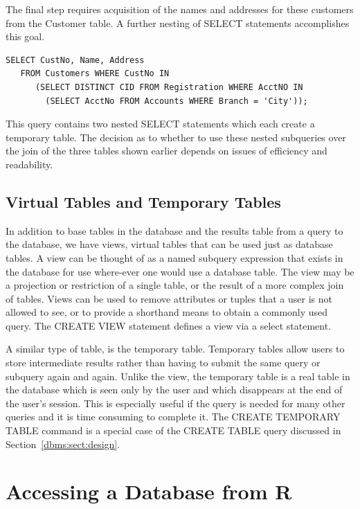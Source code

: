 The final step requires acquisition of the names and addresses 
for these customers from the Customer table.
A further nesting of SELECT statements accomplishes this goal.

\begin{verbatim}
SELECT CustNo, Name, Address
   FROM Customers WHERE CustNo IN 
      (SELECT DISTINCT CID FROM Registration WHERE AcctNO IN 
        (SELECT AcctNo FROM Accounts WHERE Branch = 'City'));
\end{verbatim}

This query contains two nested SELECT statements which each create a 
temporary table.  The decision as to whether to use these nested
subqueries over the join of the three tables shown earlier
depends on issues of efficiency and readability.


\subsection{Virtual Tables and Temporary Tables}
In addition to base tables in the database and 
the results table from a query to the database, 
we have views, virtual tables that can be 
used just as database tables. 
A view can be thought of as a named subquery expression 
that exists in the database for use where-ever 
one would use a database table. 
The view may be a projection or restriction of a single table, or
the result of a more complex join of tables. 
Views can be used to remove attributes or tuples that a user
is not allowed to see, or to provide a shorthand means to obtain
a commonly used query.  
The CREATE VIEW statement defines a view via a select statement.

A similar type of table, is the temporary table. 
Temporary tables allow users to store intermediate results rather 
than having to submit the same query or subquery again and again.  
Unlike the view, the temporary table is a real table in the database
which is seen only by the user and which disappears at the end of 
the user's session.
This is especially useful if the query
is needed for many other queries and it is time consuming to complete it.
The CREATE TEMPORARY TABLE command is a special case of the CREATE TABLE
query discussed in Section~\ref{dbms:sect:design}. 


\section{Accessing a Database from R}

